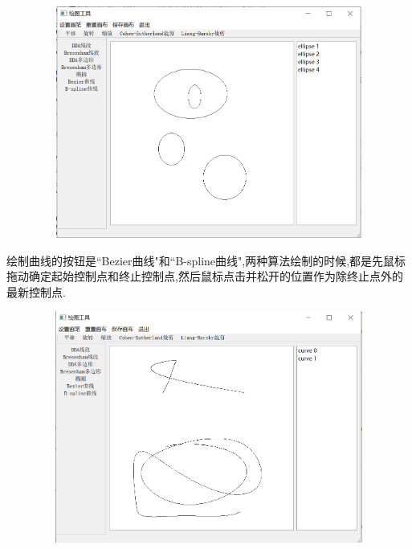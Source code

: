 \documentclass[a4paper,UTF8]{article}
\theoremstyle{definition}
\begin{document}
\begin{figure}[H]
	\includegraphics[width=5in,height=3in]{ellipse.png}
\end{figure}
绘制曲线的按钮是``Bezier曲线"和``B-spline曲线",两种算法绘制的时候,都是先鼠标拖动确定起始控制点和终止控制点,然后鼠标点击并松开的位置作为除终止点外的最新控制点.
\begin{figure}[H]
	\includegraphics[width=5in,height=3in]{curve.png}
\end{figure}
\end{document}
